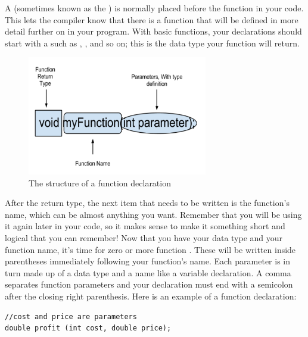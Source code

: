 A  (sometimes known as the ) is normally placed before the  function in your code. 
This lets the compiler know that there is a function that will be defined in more detail further on in your program. 
With basic functions, your declarations should start with a  such as , , and so on; this is the data type your function will return. 

\begin{figure}[tb]
  \centering
  \includegraphics[width=0.7\textwidth]{diagrams/function_structure_diagram_1.pdf}
  \caption{The structure of a function declaration} \label{fig:function_structure_diagram_1} 
\end{figure}

After the return type, the next item that needs to be written is the function's name, which can be almost anything you want. 
Remember that you will be using it again later in your code, so it makes sense to make it something short and logical that you can remember! 
Now that you have your data type and your function name, it's time for zero or more function . 
These will be written inside parentheses immediately following your function's name. 
Each parameter is in turn made up of a data type and a name like a variable declaration. 
A comma separates function parameters and your declaration must end with a semicolon after the closing right parenthesis. Here is an example of a function declaration:

\noindent\begin{minipage}{\linewidth}\begin{lstlisting}
//cost and price are parameters
double profit (int cost, double price); 
\end{lstlisting}\end{minipage}
        	

